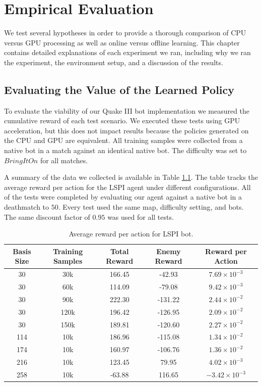 \chapter{Empirical Evaluation}
\label{chap:evaluation}

We test several hypotheses in order to provide a thorough comparison of CPU versus GPU processing as well as online versus offline learning. This chapter contains detailed explanations of each experiment we ran, including why we ran the experiment, the environment setup, and a discussion of the results.

\section{Evaluating the Value of the Learned Policy}

To evaluate the viability of our Quake III bot implementation we measured the cumulative reward of each test scenario. We executed these tests using GPU acceleration, but this does not impact results because the policies generated on the CPU and GPU are equivalent. All training samples were collected from a native bot in a match against an identical native bot. The difficulty was set to $Bring It On$ for all matches.

A summary of the data we collected is available in Table \ref{tab:reward}. The table tracks the average reward per action for the LSPI agent under different configurations. All of the tests were completed by evaluating our agent against a native bot in a deathmatch to $50$. Every test used the same map, difficulty setting, and bots. The same discount factor of $0.95$ was used for all tests.

\begin{table}%
    \centering
    \begin{tabular}{|c|c|c|c|c|}
        \hline
        Basis Size & Training Samples & Total Reward & Enemy Reward & Reward per Action \\ \hline
        \hline 
        30 & 30k & 166.45 & -42.93 & $7.69 \times 10^{-3}$ \\ \hline
        30 & 60k & 114.09 & -79.08 & $9.42 \times 10^{-3}$ \\ \hline
        30 & 90k & 222.30 & -131.22 & $2.44 \times 10^{-2}$ \\ \hline
        30 & 120k & 196.42 & -126.95 & $2.09 \times 10^{-2}$ \\ \hline
        30 & 150k & 189.81 & -120.60 & $2.27 \times 10^{-2}$ \\ \hline
        114 & 10k & 186.96 & -115.08 & $1.34 \times 10^{-2}$ \\ \hline
        174 & 10k & 160.97 & -106.76 & $1.36 \times 10^{-2}$ \\ \hline
        216 & 10k & 123.45 & 79.95 & $4.02 \times 10^{-3}$ \\ \hline
        258 & 10k & -63.88 & 116.65 & $-3.42 \times 10^{-3}$ \\
        \hline
    \end{tabular}
\caption{Average reward per action for LSPI bot.}
\label{tab:reward}
\end{table}

